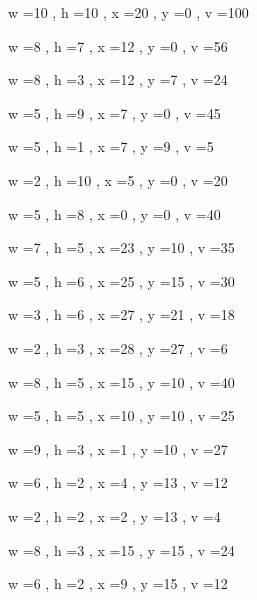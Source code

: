 \documentclass[11pt]{article}
\begin{document}
w =10 , h =10 , x =20 , y =0 , v =100
\par
w =8 , h =7 , x =12 , y =0 , v =56
\par
w =8 , h =3 , x =12 , y =7 , v =24
\par
w =5 , h =9 , x =7 , y =0 , v =45
\par
w =5 , h =1 , x =7 , y =9 , v =5
\par
w =2 , h =10 , x =5 , y =0 , v =20
\par
w =5 , h =8 , x =0 , y =0 , v =40
\par
w =7 , h =5 , x =23 , y =10 , v =35
\par
w =5 , h =6 , x =25 , y =15 , v =30
\par
w =3 , h =6 , x =27 , y =21 , v =18
\par
w =2 , h =3 , x =28 , y =27 , v =6
\par
w =8 , h =5 , x =15 , y =10 , v =40
\par
w =5 , h =5 , x =10 , y =10 , v =25
\par
w =9 , h =3 , x =1 , y =10 , v =27
\par
w =6 , h =2 , x =4 , y =13 , v =12
\par
w =2 , h =2 , x =2 , y =13 , v =4
\par
w =8 , h =3 , x =15 , y =15 , v =24
\par
w =6 , h =2 , x =9 , y =15 , v =12
\par
\newpage
\end{document}
